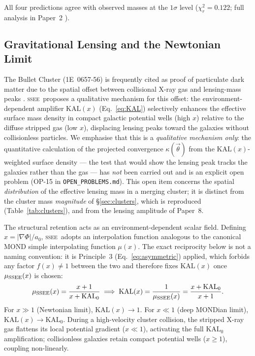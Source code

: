 \documentclass[12pt,a4paper]{article}
\newcommand{\SSEE}{\ifmmode\mathrm{SSEE}\else\textsc{ssee}\fi}
\newcommand{\KALz}{\mathrm{KAL}_0}
\begin{document}
All four predictions agree with observed masses at the $1\sigma$ level ($\chi^2_r=0.122$;
full analysis in Paper~2 \citep{SSEE_paperII}).

\subsection{Gravitational Lensing and the Newtonian Limit}
\label{sec:lensing}

The Bullet Cluster (1E~0657-56) is frequently cited as proof of particulate dark matter
due to the spatial offset between collisional X-ray gas and lensing-mass peaks
\citep{Clowe2006}. \SSEE\ proposes a qualitative mechanism for this offset: the
environment-dependent amplifier $\mathrm{KAL}(x)$ (Eq.~\ref{eq:KAL}) selectively
enhances the effective surface mass density in compact galactic potential wells
(high $x$) relative to the diffuse stripped gas (low $x$), displacing lensing peaks
toward the galaxies without collisionless particles. We emphasise that this is a
\emph{qualitative mechanism only}: the quantitative calculation of the projected
convergence $\kappa(\vec{\theta})$ from the $\mathrm{KAL}(x)$-weighted surface density
--- the test that would show the lensing peak tracks the galaxies rather than the gas
--- has \emph{not} been carried out and is an explicit open problem
(OP-15 in \texttt{OPEN\_PROBLEMS.md}). This open item concerns the spatial
\emph{distribution} of the effective lensing mass in a merging cluster; it is distinct
from the cluster mass \emph{magnitude} of §\ref{sec:clusters}, which is reproduced
(Table~\ref{tab:clusters}), and from the lensing amplitude of Paper~8.

The structural retention acts as an environment-dependent scalar field. Defining
$x = |\nabla\Phi|/a_0$, \SSEE\ adopts an interpolation function analogous to the
canonical MOND \citep{Milgrom1983,FamaeyMcGaugh2012} simple interpolating function $\mu(x)$.
The exact reciprocity below is not a naming convention: it is Principle~3
(Eq.~\ref{eq:asymmetric}) applied, which forbids any factor $f(x)\neq1$ between the two
and therefore fixes $\mathrm{KAL}(x)$ once $\mu_{\SSEE}(x)$ is chosen:
\begin{equation}
  \mu_{\SSEE}(x) = \frac{x+1}{x+\KALz}
  \implies
  \mathrm{KAL}(x) = \frac{1}{\mu_{\SSEE}(x)} = \frac{x+\KALz}{x+1}.
  \label{eq:KAL}
\end{equation}
For $x\gg1$ (Newtonian limit), $\mathrm{KAL}(x)\to1$. For $x\ll1$ (deep MONDian limit),
$\mathrm{KAL}(x)\to\KALz$. During a high-velocity cluster collision, the stripped X-ray
gas flattens its local potential gradient ($x\ll1$), activating the full $\KALz$
amplification; collisionless galaxies retain compact potential wells ($x\ge1$), coupling
non-linearly.
\end{document}
